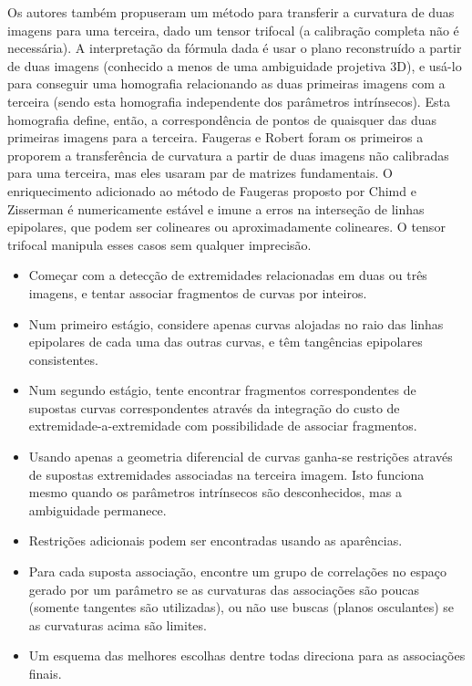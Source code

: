 Os autores também propuseram um método para transferir a curvatura de duas imagens para uma terceira, dado um tensor trifocal (a calibração completa não é necessária). A interpretação da fórmula dada é usar o plano reconstruído a partir de duas imagens (conhecido a menos de uma ambiguidade projetiva 3D), e usá-lo para conseguir uma homografia relacionando as duas primeiras imagens com a terceira (sendo esta homografia independente dos parâmetros intrínsecos). Esta homografia define, então, a correspondência de pontos de quaisquer das duas primeiras imagens para a terceira. Faugeras e Robert foram os primeiros a proporem a transferência de curvatura a partir de duas imagens não calibradas para uma terceira, mas eles usaram par de matrizes fundamentais. O enriquecimento adicionado ao método de Faugeras proposto por Chimd e Zisserman é numericamente estável e imune a erros na interseção de linhas epipolares, que podem ser colineares ou aproximadamente colineares. O tensor trifocal manipula esses casos sem qualquer imprecisão.\\


\begin{itemize}
\item Começar com a detecção de extremidades relacionadas em duas ou três imagens, e tentar associar fragmentos de curvas por inteiros.
\item Num primeiro estágio, considere apenas curvas alojadas no raio das linhas epipolares de cada uma das outras curvas, e têm tangências epipolares consistentes.
\item Num segundo estágio, tente encontrar fragmentos correspondentes de supostas curvas correspondentes através da integração do custo de extremidade-a-extremidade com possibilidade de associar fragmentos.
\item Usando apenas a geometria diferencial de curvas ganha-se restrições através de supostas extremidades associadas na terceira imagem. Isto funciona mesmo quando os parâmetros intrínsecos são desconhecidos, mas a ambiguidade permanece.
\item Restrições adicionais podem ser encontradas usando as aparências.
\item Para cada suposta associação, encontre um grupo de correlações no espaço gerado por um parâmetro se as curvaturas das associações são poucas (somente tangentes são utilizadas), ou não use buscas (planos osculantes) se as curvaturas acima são limites.
\item Um esquema das melhores escolhas dentre todas direciona para as associações finais.
\end{itemize}

